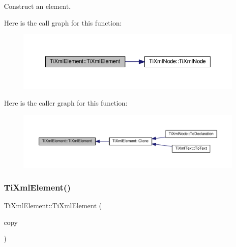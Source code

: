 Construct an element. 

Here is the call graph for this function\+:
\nopagebreak
\begin{figure}[H]
\begin{center}
\leavevmode
\includegraphics[width=350pt]{class_ti_xml_element_a01bc3ab372d35da08efcbbe65ad90c60_cgraph}
\end{center}
\end{figure}
Here is the caller graph for this function\+:
\nopagebreak
\begin{figure}[H]
\begin{center}
\leavevmode
\includegraphics[width=350pt]{class_ti_xml_element_a01bc3ab372d35da08efcbbe65ad90c60_icgraph}
\end{center}
\end{figure}
\mbox{\label{class_ti_xml_element_a1ca4465f3c2eac6a60e641cd7f1d9f7e}} 
\subsubsection{\texorpdfstring{Ti\+Xml\+Element()}{TiXmlElement()}\hspace{0.1cm}{\footnotesize\ttfamily [2/2]}}
{\footnotesize\ttfamily Ti\+Xml\+Element\+::\+Ti\+Xml\+Element (\begin{DoxyParamCaption}\item[{const \hyperlink{class_ti_xml_element}{Ti\+Xml\+Element} \&}]{copy }\end{DoxyParamCaption})}

